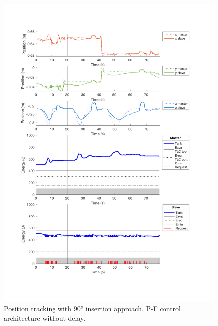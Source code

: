 \begin{center}
	\begin{figure}
		\includegraphics[width=\textwidth, keepaspectratio]{plots/pf90/Position.pdf}
		\caption{Position tracking with 90° insertion approach. P-F control architecture without delay.}
		\label{graph:pf90/Position}
	\end{figure}
\end{center}
